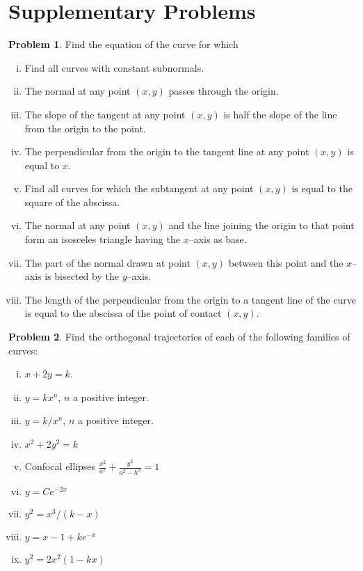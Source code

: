 \documentclass{scrartcl}
\theoremstyle{definition}
\newtheorem{problem}{Problem}
\begin{document}


\section*{Supplementary Problems}
\begin{problem}
Find the equation of the curve for which
\begin{enumerate}[(i)]
	\item Find all curves with constant subnormals.
	\item The normal at any point $(x,y)$ passes through the origin.
	\item The slope of the tangent at any point $(x,y)$ is half the slope of the line from the origin to the point.
	\item The perpendicular from the origin to the tangent line at any point $(x,y)$ is equal to $x$.
	\item Find all curves for which the subtangent at any point $(x,y)$ is equal to the square of the abscissa.
	\item The normal at any point $(x,y)$ and the line joining the origin to that point form an isosceles triangle having the $x$--axis as base.
	\item The part of the normal drawn at point $(x,y)$ between this point and the $x$--axis is bisected by the $y$--axis.
	\item The length of the perpendicular from the origin to a tangent line of the curve is equal to the abscissa of the point of contact $(x,y)$.
\end{enumerate}
\end{problem}

\begin{problem}
Find the orthogonal trajectories of each of the following families of
curves: 
\begin{multicols}{2}
\begin{enumerate}[(i)]
	\item $x+2y=k$.
	\item $y=kx^n$, $n$ a positive integer.
	\item $y=k/x^n$, $n$ a positive integer.
	\item $x^2+2y^2=k$
	\item Confocal ellipses $\tfrac{x^2}{a^2}+\tfrac{y^2}{a^2-h^2}=1$
	\item $y=Ce^{-2x}$
	\item $y^2 = x^3/(k-x)$
	\item $y=x-1+ke^{-x}$
	\item $y^2 = 2x^2(1-kx)$
\end{enumerate}
\end{multicols}
\end{problem}
\end{document}
